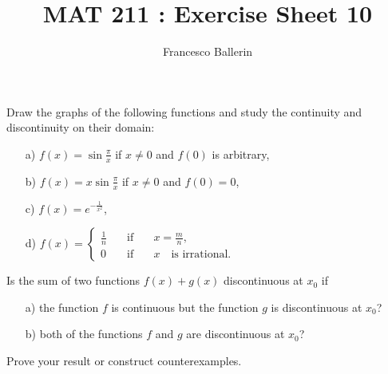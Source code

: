 \documentclass[11pt]{article}%
\title{MAT 211 : Exercise Sheet 10}
\author{Francesco Ballerin}
\date{\color{gray}{\small{francesco.ballerin@uib.no}}}
\begin{document}
\begin{minipage}[t]{\dimexpr \textwidth-6cm-\columnsep}
     \maketitle
\end{minipage}
\hfill\noindent{}

\vspace{50pt}

\begin{Exercise}[title=*$\dagger$] Draw the graphs of the following functions and study the continuity and discontinuity on their domain:
\begin{itemize}
	\item[a)]{$f(x)=\sin\frac{\pi}{x}$ if $x\neq 0$ and $f(0)$ is arbitrary,}
	\item[b)]{$f(x)=x\sin\frac{\pi}{x}$ if $x\neq 0$ and $f(0)=0$,}
	\item[c)]{$f(x)=e^{-\frac{1}{x^2}}$,}
	\item[d)]{$f(x)=\left\{\begin{array}{lllc}\frac{1}{n} \quad & \text{if}\quad & x=\frac{m}{n},\\
			0 &\text{if}  & x\quad\text{is irrational}.\end{array}\right.
		$}
\end{itemize}
\end{Exercise}

\begin{Exercise}[title=*]
	 Is the sum of two functions $f(x)+g(x)$ discontinuous at $x_0$ if 
\begin{itemize}
	\item[a)]{the function $f$ is continuous but the function $g$ is discontinuous at $x_0$?}
	\item[b)]{both of the functions $f$ and $g$ are discontinuous at $x_0$?}
\end{itemize} Prove your result or construct counterexamples.
\end{Exercise}
\end{document}
